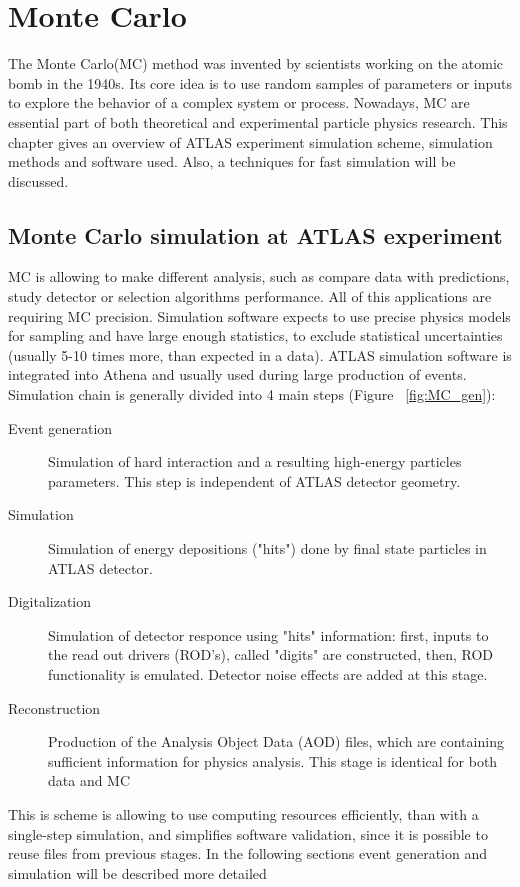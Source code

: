 
\chapter{Monte Carlo}
The Monte Carlo(MC) method was invented by scientists working on the atomic bomb in the 1940s. Its core idea is to use random samples of parameters or inputs to explore the behavior of a complex system or process.  Nowadays, MC are essential part of both theoretical and experimental particle physics research.
This chapter gives an overview of ATLAS experiment simulation scheme, simulation methods and software used. Also, a techniques for fast simulation will be discussed. 

\section{Monte Carlo simulation at ATLAS experiment}

\begin{figure}[h]
\end{figure}

MC is allowing to make different analysis, such as compare data with predictions, study detector or selection algorithms performance. All of this applications are requiring MC precision. Simulation software expects to use precise physics models for sampling and have large enough statistics, to exclude statistical uncertainties (usually 5-10 times more, than expected in a data). ATLAS simulation software is integrated into Athena and usually used during large production of events. Simulation chain is generally divided into 4 main steps (Figure ~\ref{fig:MC_gen}):
\begin{description}
\item[Event generation]Simulation of hard interaction and a resulting high-energy particles parameters. This step is independent of ATLAS detector geometry.
\item[Simulation]Simulation of energy depositions ("hits") done by final state particles in ATLAS detector.
\item[Digitalization] Simulation of detector responce using "hits" information:  first, inputs to the read out drivers (ROD's), called "digits" are constructed, then, ROD functionality is emulated. Detector noise effects are added at this stage. 
\item[Reconstruction] Production of the Analysis Object Data (AOD) files, which are containing sufficient information for physics analysis. This stage is identical for both data and MC
\end{description}
This is scheme is allowing to use computing resources efficiently, than with a single-step simulation, and simplifies software validation, since it is possible to reuse files from previous stages. In the following sections event generation and simulation will be described more detailed

